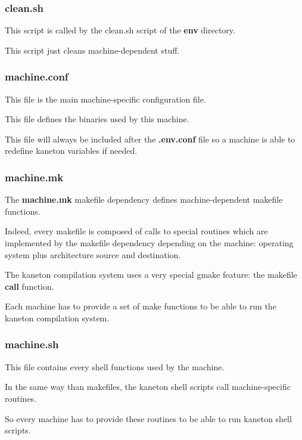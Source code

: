 
\begin{frame}
  \frametitle{clean.sh}

  This script is called by the clean.sh script of the \textbf{env}
  directory.

  \nl

  This script just cleans machine-dependent stuff.
\end{frame}


\begin{frame}
  \frametitle{machine.conf}

  This file is the main machine-specific configuration file.

  \nl

  This file defines the binaries used by this machine.

  \nl

  This file will always be included after the \textbf{.env.conf}
  file so a machine is able to redefine kaneton variables if needed.
\end{frame}


\begin{frame}
  \frametitle{machine.mk}

  The \textbf{machine.mk} makefile dependency defines machine-dependent
  makefile functions.

  \nl

  Indeed, every makefile is composed of calls to special routines
  which are implemented by the makefile dependency depending on the
  machine: operating system plus architecture source and destination.

  \nl

  The kaneton compilation system uses a very special gmake feature:
  the makefile \textbf{call} function.

  \nl

  Each machine has to provide a set of make functions to be able to run
  the kaneton compilation system.
\end{frame}


\begin{frame}
  \frametitle{machine.sh}

  This file contains every shell functions used by the machine.

  \nl

  In the same way than makefiles, the kaneton shell scripts call
  machine-specific routines.

  \nl

  So every machine has to provide these routines to be able to run
  kaneton shell scripts.
\end{frame}

